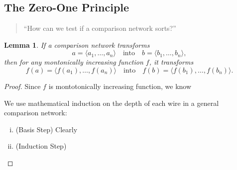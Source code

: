 \documentclass[12pt,openany]{book}
\newtheorem{lemma}[theorem]{Lemma}
\theoremstyle{definition}
\begin{document}
	\subsection{The Zero-One Principle}
	\begin{quote}
		``How can we test if a comparison network sorts?''
	\end{quote}
	\vspace{8pt}
	\begin{tcolorbox}[colframe=lemcolor,title={\color{white}\bf }]
		\begin{lemma}
			If a comparison network transforms \[
			a=\langle a_1,\dots,a_n\rangle\quad\text{into}\quad b=\langle b_1,\dots,b_n\rangle,
			\] then for any montonically increasing function \(f\), it transforms \[
			f(a)=\langle f(a_1),\dots,f(a_n)\rangle\quad\text{into}\quad f(b)=\langle f(b_1),\dots,f(b_n)\rangle.
			\]
		\end{lemma}
	\end{tcolorbox}
	\begin{proof}
		Since \(f\) is montotonically increasing function, we know \begin{center}
		\end{center} We use mathematical induction on the depth of each wire in a general comparison network: \begin{enumerate}[(i)]
		\item (Basis Step) Clearly
		\item (Induction Step)
	\end{enumerate}
	\end{proof}
	\vspace{8pt}
\end{document}
